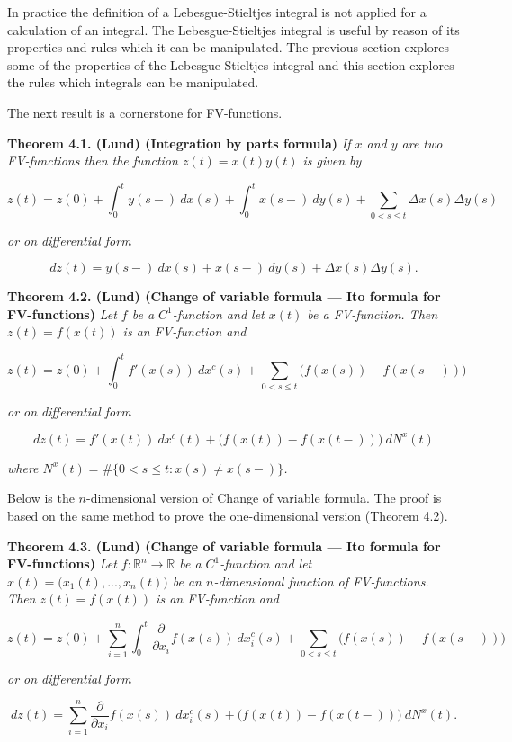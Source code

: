 \documentclass[a4paper,12pt,openany]{book}
\begin{document}
In practice the definition of a Lebesgue-Stieltjes integral is not applied for a calculation of an integral. The Lebesgue-Stieltjes integral is useful by reason of its properties and rules which it can be manipulated. The previous section explores some of the properties of the Lebesgue-Stieltjes integral and this section explores the rules which integrals can be manipulated.

The next result is a cornerstone for FV-functions.

\textbf{Theorem 4.1. (Lund) (Integration by parts formula)} \emph{If \(x\) and \(y\) are two FV-functions then the function \(z(t)=x(t)y(t)\) is given by}

\[
z(t)=z(0)+\int_0^t y(s-)\ dx(s)+\int_0^t x(s-)\ dy(s)+\sum_{0<s\le t}\Delta x(s)\Delta y(s)
\]

\emph{or on differential form}

\[
dz(t)=y(s-)\ dx(s)+ x(s-)\ dy(s)+\Delta x(s)\Delta y(s).
\]

\textbf{Theorem 4.2. (Lund) (Change of variable formula --- Ito formula for FV-functions)} \emph{Let \(f\) be a \(C^1\)-function and let \(x(t)\) be a FV-function. Then \(z(t)=f(x(t))\) is an FV-function and}

\[
z(t)=z(0)+\int_0^tf'(x(s))\ dx^c(s)+\sum_{0<s\le t}\Big(f(x(s))-f(x(s-))\Big)
\]

\emph{or on differential form}

\[
dz(t)=f'(x(t))\ dx^c(t)+\Big(f(x(t))-f(x(t-))\Big)\ dN^x(t)
\]

\emph{where \(N^x(t)=\#\{0<s\le t: x(s)\ne x(s-)\}\).}

Below is the \(n\)-dimensional version of Change of variable formula. The proof is based on the same method to prove the one-dimensional version (Theorem 4.2).

\textbf{Theorem 4.3. (Lund) (Change of variable formula --- Ito formula for FV-functions)} \emph{Let \(f : \mathbb R^n\to\mathbb R\) be a \(C^1\)-function and let \(x(t)=\big(x_1(t),...,x_n(t)\big)\) be an \(n\)-dimensional function of FV-functions. Then \(z(t)=f(x(t))\) is an FV-function and}

\[
z(t)=z(0)+\sum_{i=1}^n\int_0^t\frac{\partial}{\partial x_i}f(x(s))\ dx_i^c(s)+\sum_{0<s\le t}\Big(f(x(s))-f(x(s-))\Big)
\]

\emph{or on differential form}

\[
dz(t)=\sum_{i=1}^n\frac{\partial}{\partial x_i}f(x(s))\ dx_i^c(s)+\Big(f(x(t))-f(x(t-))\Big)\ dN^x(t).
\]
\end{document}
